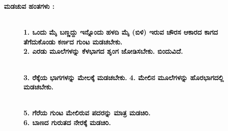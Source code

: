 \noindent
\textbf{ಮಡಚುವ ಹಂತಗಳು :}
\begin{figure}[H]
\\
\textbf{1. ಒಂದು ಮೈ ಬಣ್ಣದ್ದು ಇನ್ನೊಂದು ಹಳದಿ ಮೈ (ಬಿಳಿ) ಇರುವ ಚೌರಸ ಆಕಾರದ ಕಾಗದ ತೆಗೆದುಕೊಂಡು ಕರ್ಣದ ಗುಂಟ ಮಡಚಬೇಕು.}\\
\textbf{2. ಎರಡು ಮೂಲೆಗಳನ್ನು ಕೆಳಭಾಗದ ಶೃಂಗ ಜೋಡಿಸಬೇಕು. ಬಿಂದುವಿದೆ.}
\end{figure}
\begin{figure}[H]
\\
\textbf{3. ರೆಕ್ಕೆಯ ಭಾಗಗಳನ್ನು ಮೇಲಕ್ಕೆ ಮಡಚಬೇಕು.}
\textbf{4. ಮೇಲಿನ ಮೂಲೆಗಳನ್ನು ಹೊರಭಾಗದಲ್ಲಿ ಮಡಚಬೇಕು.}
\end{figure}
\begin{figure}[H]
\\
\textbf{5. ಗೆರೆಯ ಗುಂಟ ಮೇಲಿರುವ ಪದರನ್ನು ಮಾತ್ರ ಮಡಚಿರಿ.}\\
\textbf{6. ಬಾಣದ ಗುರುತದ ನೇರಕ್ಕೆ ಮಡಚಿರಿ.}
\end{figure}


